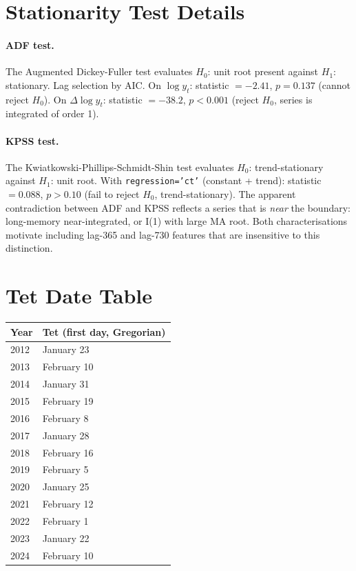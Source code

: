 \documentclass{article}
\begin{document}
\appendix
\section{Stationarity Test Details}
\label{app:stationarity}

\paragraph{ADF test.}
The Augmented Dickey-Fuller test \citep{hyndman2018forecasting} evaluates $H_0$:
unit root present against $H_1$: stationary.
Lag selection by AIC.
On $\log y_t$: statistic $= -2.41$, $p = 0.137$ (cannot reject $H_0$).
On $\Delta \log y_t$: statistic $= -38.2$, $p < 0.001$ (reject $H_0$,
series is integrated of order 1).

\paragraph{KPSS test.}
The Kwiatkowski-Phillips-Schmidt-Shin test evaluates $H_0$: trend-stationary
against $H_1$: unit root.
With \texttt{regression='ct'} (constant + trend): statistic $= 0.088$,
$p > 0.10$ (fail to reject $H_0$, trend-stationary).
The apparent contradiction between ADF and KPSS reflects a series that is
\emph{near} the boundary: long-memory near-integrated, or I(1) with large
MA root.
Both characterisations motivate including lag-365 and lag-730 features that
are insensitive to this distinction.

\section{Tet Date Table}
\label{app:tet}

\begin{center}
\small
\begin{tabular}{ll}
\toprule
\textbf{Year} & \textbf{Tet (first day, Gregorian)}\\
\midrule
2012 & January 23 \\
2013 & February 10 \\
2014 & January 31 \\
2015 & February 19 \\
2016 & February 8 \\
2017 & January 28 \\
2018 & February 16 \\
2019 & February 5 \\
2020 & January 25 \\
2021 & February 12 \\
2022 & February 1 \\
2023 & January 22 \\
2024 & February 10 \\
\bottomrule
\end{tabular}
\end{center}
\end{document}
